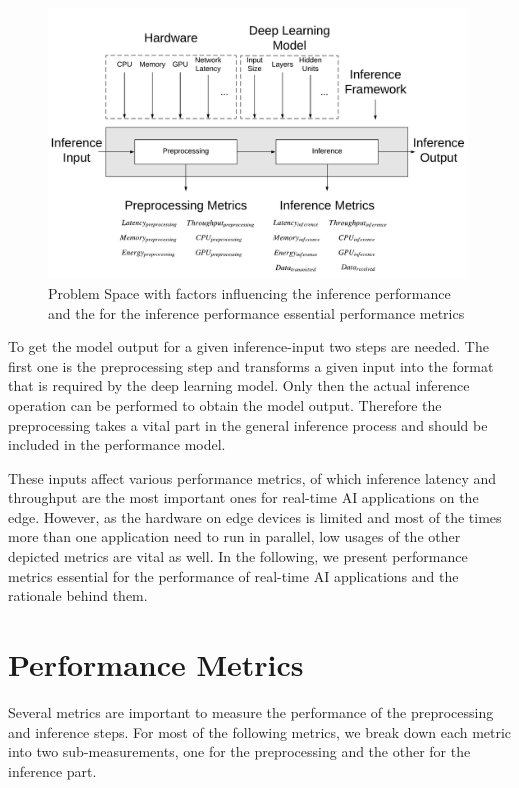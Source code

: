 \begin{figure}[!htb]
\centering
\includegraphics[width=0.99\textwidth]{./Bilder/PerformanceModel.pdf}
\caption{Problem Space with factors influencing the inference performance and the for the inference performance essential performance metrics}
\label{fig:perfmodel}
\end{figure}

To get the model output for a given inference-input two steps are needed. The first one is the preprocessing step and transforms a given input into the format that is required by the deep learning model. Only then the actual inference operation can be performed to obtain the model output. Therefore the preprocessing takes a vital part in the general inference process and should be included in the performance model.

These inputs affect various performance metrics, of which inference latency and throughput are the most important ones for real-time AI applications on the edge. However, as the hardware on edge devices is limited and most of the times more than one application need to run in parallel, low usages of the other depicted metrics are vital as well.
In the following, we present performance metrics essential for the performance of real-time AI applications and the rationale behind them.







\section{Performance Metrics}
\label{chap:metrics}
Several metrics are important to measure the performance of the preprocessing and inference steps. For most of the following metrics, we break down each metric into two sub-measurements, one for the preprocessing and the other for the inference part.

